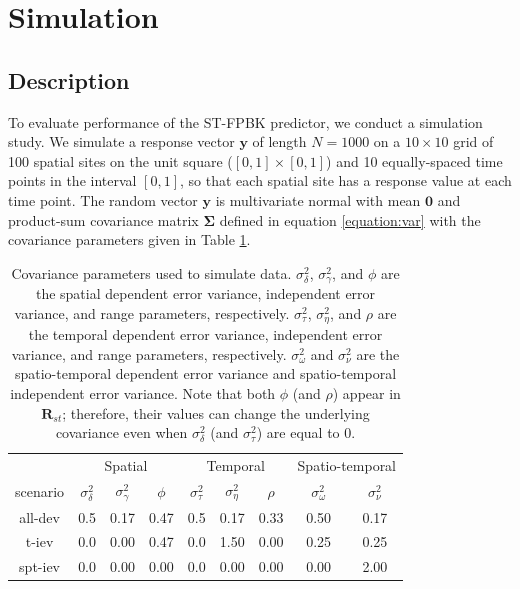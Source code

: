 \documentclass[smallextended]{svjour3}       %
\begin{document}
\hypertarget{section:Simulation}{%
\section{Simulation}\label{section:Simulation}}

\hypertarget{description}{%
\subsection{Description}\label{description}}

To evaluate performance of the ST-FPBK predictor, we conduct a
simulation study. We simulate a response vector \(\mathbf{y}\) of length
\(N = 1000\) on a \(10 \times 10\) grid of 100 spatial sites on the unit
square (\([0, 1] \times [0, 1]\)) and 10 equally-spaced time points in
the interval \([0, 1]\), so that each spatial site has a response value
at each time point. The random vector \(\mathbf{y}\) is multivariate
normal with mean \(\mathbf{0}\) and product-sum covariance matrix
\(\bm{\Sigma}\) defined in equation \ref{equation:var} with the
covariance parameters given in Table \ref{tab:simparmtab}.

\begin{table}[H]

\caption{\label{tab:simparmtab}Covariance parameters used to simulate data. $\sigma^2_{\delta}$, $\sigma^2_{\gamma}$, and $\phi$ are the spatial dependent error variance, independent error variance, and range parameters, respectively. $\sigma^2_{\tau}$, $\sigma^2_{\eta}$, and $\rho$ are the temporal dependent error variance, independent error variance, and range parameters, respectively. $\sigma^2_{\omega}$ and $\sigma^2_{\nu}$ are the spatio-temporal dependent error variance and spatio-temporal independent error variance. Note that both $\phi$ (and $\rho$) appear in $\mathbf{R}_{st}$; therefore, their values can change the underlying covariance even when $\sigma^2_{\delta}$ (and $\sigma^2_{\tau}$) are equal to 0.}
\centering
\begin{tabular}[t]{ccccccccc}
\toprule
\multicolumn{1}{c}{ } & \multicolumn{3}{c}{Spatial} & \multicolumn{3}{c}{Temporal} & \multicolumn{2}{c}{Spatio-temporal} \\
\cmidrule(l{3pt}r{3pt}){2-4} \cmidrule(l{3pt}r{3pt}){5-7} \cmidrule(l{3pt}r{3pt}){8-9}
scenario & $\sigma^2_{\delta}$ & $\sigma^2_{\gamma}$ & $\phi$ & $\sigma^2_{\tau}$ & $\sigma^2_{\eta}$ & $\rho$ & $\sigma^2_{\omega}$ & $\sigma^2_{\nu}$\\
\midrule
all-dev & 0.5 & 0.17 & 0.47 & 0.5 & 0.17 & 0.33 & 0.50 & 0.17\\
t-iev & 0.0 & 0.00 & 0.47 & 0.0 & 1.50 & 0.00 & 0.25 & 0.25\\
spt-iev & 0.0 & 0.00 & 0.00 & 0.0 & 0.00 & 0.00 & 0.00 & 2.00\\
\bottomrule
\end{tabular}
\end{table}
\end{document}
